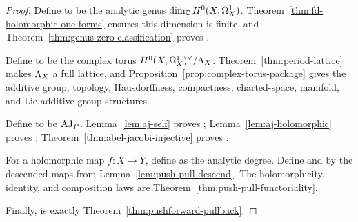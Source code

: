 \begin{proof}\leanok
Define  to be the analytic genus
\(\dim_{\mathbb{C}}H^{0}(X,\Omega^{1}_{X})\). Theorem~\ref{thm:fd-holomorphic-one-forms}
ensures this dimension is finite, and Theorem~\ref{thm:genus-zero-classification}
proves .

Define  to be the complex torus
\(H^{0}(X,\Omega^{1}_{X})^{\vee}/\Lambda_X\). Theorem~\ref{thm:period-lattice} makes
\(\Lambda_X\) a full lattice, and Proposition~\ref{prop:complex-torus-package}
gives the additive group, topology, Hausdorffness, compactness, charted-space,
manifold, and Lie additive group structures.

Define  to be \(\operatorname{AJ}_P\). Lemma~\ref{lem:aj-self}
proves ; Lemma~\ref{lem:aj-holomorphic} proves
; Theorem~\ref{thm:abel-jacobi-injective} proves
.

For a holomorphic map \(f:X\to Y\), define  as
the analytic degree. Define  and
 by the descended maps from
Lemma~\ref{lem:push-pull-descend}. The holomorphicity, identity, and
composition laws are Theorem~\ref{thm:push-pull-functoriality}.

Finally,  is exactly
Theorem~\ref{thm:pushforward-pullback}.
\end{proof}
